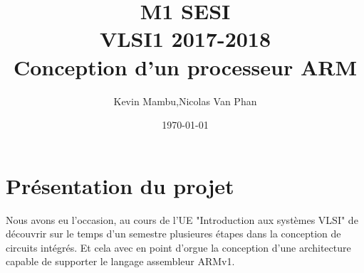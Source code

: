 \documentclass[10pt]{article}
\author{Kevin Mambu,Nicolas Van Phan}
\date{\today}
\title{M1 SESI\\VLSI1 2017-2018\\Conception d'un processeur ARM}
\begin{document}
\maketitle
\newpage
\tableofcontents
\newpage

\section{Présentation du projet}

Nous avons eu l'occasion, au cours de l'UE "Introduction aux systèmes VLSI" de 
découvrir sur le temps d'un semestre plusieures étapes dans la conception de 
circuits intégrés. Et cela avec en point d'orgue la conception d'une architecture 
capable de supporter le langage assembleur ARMv1.
\end{document}
